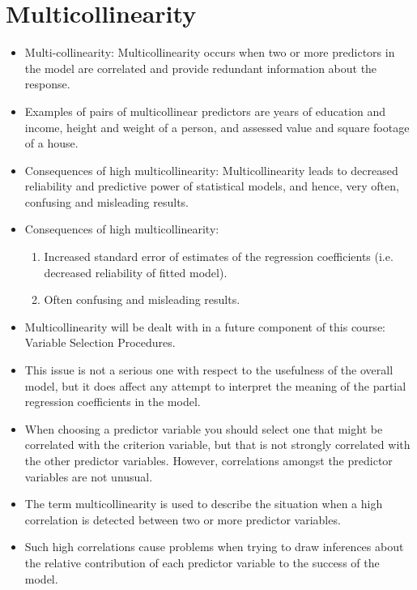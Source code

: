 \documentclass[]{report}
\begin{document}
\section*{Multicollinearity}
\begin{itemize}

\item  Multi-collinearity: Multicollinearity occurs when two or more predictors in the model are correlated
and provide redundant information about the response.
\item  Examples of pairs of multicollinear predictors are years of education and income, height and weight of a
person, and assessed value and square footage of a house.
\item  Consequences of high multicollinearity:
Multicollinearity leads to decreased reliability and predictive power of statistical models, and hence, very
often, confusing and misleading results.
\item Consequences of high multicollinearity:
\begin{enumerate}
\item Increased standard error of estimates of the regression coefficients (i.e. decreased reliability of fitted
model).
\item Often confusing and misleading results.
\end{enumerate}
\item  Multicollinearity will be dealt with in a future component of this course: Variable Selection Procedures.
\item  This issue is not a serious one with respect to the usefulness of the overall model, but it does affect any attempt to interpret the meaning of the partial regression coefficients in the model.
\item  When choosing a predictor variable you should select one that might be correlated with the criterion
variable, but that is not strongly correlated with the other predictor variables. However, correlations
amongst the predictor variables are not unusual.
\item  The term multicollinearity is used to describe the situation when a high correlation is detected between
two or more predictor variables.
\item  Such high correlations cause problems when trying to draw inferences about the relative contribution of
each predictor variable to the success of the model.
\end{itemize}
\end{document}
